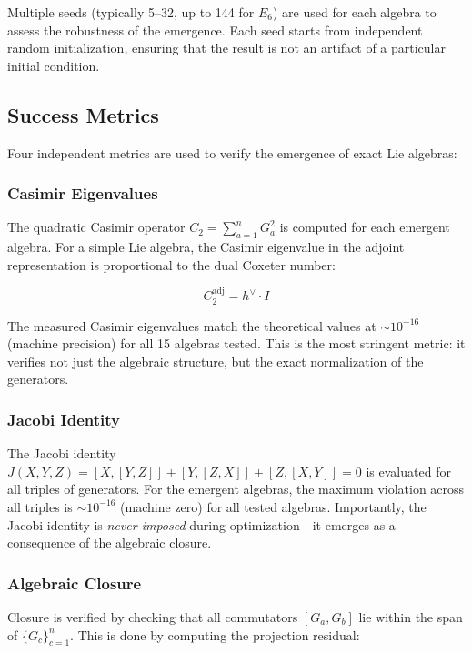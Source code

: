 Multiple seeds (typically 5--32, up to 144 for $E_6$) are used for each algebra to assess the robustness of the emergence. Each seed starts from independent random initialization, ensuring that the result is not an artifact of a particular initial condition.

\subsection{Success Metrics}\label{sec:success_metrics}

Four independent metrics are used to verify the emergence of exact Lie algebras:

\subsubsection{Casimir Eigenvalues}

The quadratic Casimir operator $C_2 = \sum_{a=1}^n G_a^2$ is computed for each emergent algebra. For a simple Lie algebra, the Casimir eigenvalue in the adjoint representation is proportional to the dual Coxeter number:

\begin{equation}
C_2^{\mathrm{adj}} = h^\vee \cdot I
\end{equation}

The measured Casimir eigenvalues match the theoretical values at $\sim 10^{-16}$ (machine precision) for all 15 algebras tested. This is the most stringent metric: it verifies not just the algebraic structure, but the exact normalization of the generators.

\subsubsection{Jacobi Identity}

The Jacobi identity $J(X,Y,Z) = [X,[Y,Z]] + [Y,[Z,X]] + [Z,[X,Y]] = 0$ is evaluated for all triples of generators. For the emergent algebras, the maximum violation across all triples is $\sim 10^{-16}$ (machine zero) for all tested algebras. Importantly, the Jacobi identity is \textit{never imposed} during optimization---it emerges as a consequence of the algebraic closure.

\subsubsection{Algebraic Closure}

Closure is verified by checking that all commutators $[G_a, G_b]$ lie within the span of $\{G_c\}_{c=1}^n$. This is done by computing the projection residual:

